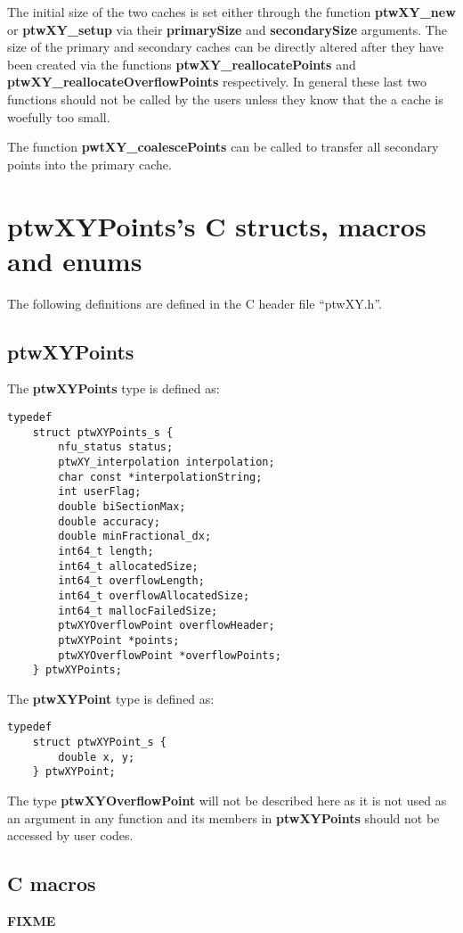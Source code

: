 \documentclass[11pt]{article}
\newcommand{\highlight}[1]{{\bf #1}}
\begin{document}
The initial size of the two caches is set either through the function \highlight{ptwXY\_new} or \highlight{ptwXY\_\-setup} via their
\highlight{primarySize} and \highlight{secondarySize} arguments. The size of the primary and secondary caches can be directly altered after
they have been created via the
functions \highlight{ptwXY\_reallo\-cate\-Points} and \highlight{ptwXY\_\-reallo\-cate\-Overflow\-Points} respectively. 
In general these last two functions should
not be called by the users unless they know that the a cache is woefully too small.

The function \highlight{pwtXY\_coalescePoints} can be called to transfer all secondary points into the primary cache.

\section{ptwXYPoints's C structs, macros and enums}
The following definitions are defined in the C header file ``ptwXY.h''.

\subsection{ptwXYPoints}
The \highlight{ptwXYPoints} type is defined as:
\begin{verbatim}
typedef
    struct ptwXYPoints_s {
        nfu_status status;
        ptwXY_interpolation interpolation;
        char const *interpolationString;
        int userFlag;
        double biSectionMax;
        double accuracy;
        double minFractional_dx;
        int64_t length;
        int64_t allocatedSize;
        int64_t overflowLength;
        int64_t overflowAllocatedSize;
        int64_t mallocFailedSize;
        ptwXYOverflowPoint overflowHeader;
        ptwXYPoint *points;
        ptwXYOverflowPoint *overflowPoints;
    } ptwXYPoints;
\end{verbatim}

\noindent
The \highlight{ptwXYPoint} type is defined as:
\begin{verbatim}
typedef
    struct ptwXYPoint_s {
        double x, y;
    } ptwXYPoint;
\end{verbatim}

\noindent
The type \highlight{ptwXYOverflowPoint} will not be described here as it is not used as an argument in any function and
its members in \highlight{ptwXYPoints} should not be accessed by user codes.

\subsection{C macros}
\highlight{FIXME}
\end{document}
